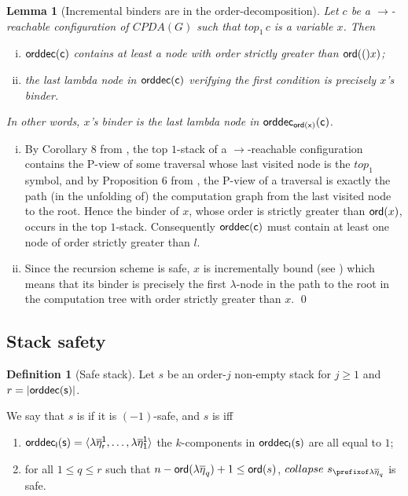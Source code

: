 \documentclass[a4paper]{article}
\newtheorem{lemma}{Lemma}[section]
\theoremstyle{remark}
\theoremstyle{definition}
\newtheorem{definition}{Definition}[section]
\newcommand\orddec{\sf orddec}
\begin{document}
\begin{lemma}[Incremental binders are in the order-decomposition]
\label{lem:binder_in_ordecompos} Let $c$ be a $\rightarrow$-reachable
configuration of $CPDA(G)$ such that $top_1\,c$ is a variable $x$. Then
\begin{enumerate}[i.]
\item $\orddec(c)$ contains at least a node with order strictly greater than ${\sf ord}(()x)$;
\item the last lambda node in $\orddec(c)$ verifying the first condition is precisely $x$'s binder.
\end{enumerate}
In other words, $x$'s binder is the last lambda node in $\orddec_{\ord x}(c)$.
\end{lemma}
\proof
\begin{enumerate}[i.]
\item By Corollary 8 from \cite{hague-sto07}, the top $1$-stack of a $\rightarrow$-reachable configuration contains the P-view of some
    traversal whose last visited node is the $top_1$ symbol, and
    by Proposition 6 from \cite{OngLics2006}, the P-view of a
    traversal is exactly the path (in the unfolding of) the
    computation graph from the last visited node to
    the root. Hence the binder of $x$, whose order
    is strictly greater than ${\sf ord}(x)$, occurs in the top $1$-stack.
    Consequently $\orddec(c)$ must contain at least one node of order strictly greater than $l$.

\item Since the recursion scheme is safe, $x$ is
 incrementally bound (see \cite{blumong:safelambdacalculus})
 which means that its binder is precisely the first $\lambda$-node in the
 path to the root in the computation tree with order strictly
 greater than $x$. \qed
\end{enumerate}

\subsection{Stack safety}

\begin{definition}[Safe stack]
\label{dfn:safestack} Let $s$ be an order-$j$ non-empty stack for $j\geq1$ and $r
= |\orddec(s)|$.

We say that $s$ is  if it is $(-1)$-safe,
and $s$ is  iff
    \begin{enumerate}[1.]
    \item $\orddec_l(s) = \langle \lambda \overline\eta_r^1, \ldots ,
    \lambda \overline{\eta}_1^1 \rangle$ \ie the $k$-components in $\orddec_l(s)$ are all equal to $1$;

    \item for all $1 \leq q \leq r$ such that $n-{\sf ord}(\lambda \overline\eta_q)+1 \leq {\sf ord}(s)$,
    $collapse~s_{\prefixof \lambda\overline\eta_q}$ is safe.
    \end{enumerate}

\end{definition}
\end{document}

